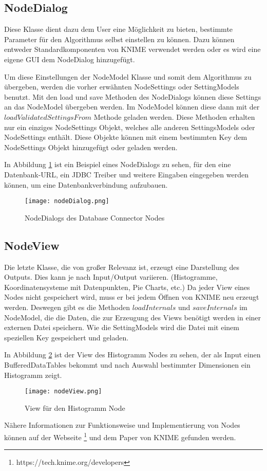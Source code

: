 \subsection{NodeDialog}
\label{ch:Analyse:sec:knime:subsec:nodeDialog}
Diese Klasse dient dazu dem User eine Möglichkeit zu bieten, bestimmte Parameter für den Algorithmus selbst einstellen zu können. 
Dazu können entweder Standardkomponenten von KNIME verwendet werden oder es wird eine eigene GUI dem NodeDialog hinzugefügt.

Um diese Einstellungen der NodeModel Klasse und somit dem Algorithmus zu übergeben, werden die vorher erwähnten NodeSettings oder SettingModels benutzt. Mit den load und save Methoden des NodeDialogs können diese Settings an das NodeModel übergeben werden. Im NodeModel können diese dann mit der $loadValidatedSettingsFrom$ Methode geladen werden. Diese Methoden erhalten nur ein einziges NodeSettings Objekt, welches alle anderen SettingsModels oder NodeSettings enthält. Diese Objekte können mit einem bestimmten Key dem NodeSettings Objekt hinzugefügt oder geladen werden.

In Abbildung \ref{img:nodeDialog} ist ein Beispiel eines NodeDialogs zu sehen, für den eine Datenbank-URL, ein JDBC Treiber und weitere Eingaben eingegeben werden können, um eine Datenbankverbindung aufzubauen.

\begin{figure}[H]
	\centering
	\texttt{[image: nodeDialog.png]}
	\caption{NodeDialogs des Database Connector Nodes}
	\label{img:nodeDialog}
\end{figure}

\subsection{NodeView}
\label{ch:Analyse:sec:knime:subsec:nodeView}
Die letzte Klasse, die von großer Relevanz ist, erzeugt eine Darstellung des Outputs. Dies kann je nach Input/Output variieren. (Histogramme, Koordinatensysteme mit Datenpunkten, Pie Charts, etc.)
Da jeder View eines Nodes nicht gespeichert wird, muss er bei jedem Öffnen von KNIME neu erzeugt werden.
Deswegen gibt es die Methoden $loadInternals$ und $saveInternals$ im NodeModel, die die Daten, die zur Erzeugung des Views benötigt werden in einer externen Datei speichern. Wie die SettingModels wird die Datei mit einem speziellen Key gespeichert und geladen. 

In Abbildung \ref{img:nodeView} ist der View des Histogramm Nodes zu sehen, der als Input einen BufferedDataTables bekommt und nach Auswahl bestimmter Dimensionen ein Histogramm zeigt. 

\begin{figure}[H]
	\centering
	\texttt{[image: nodeView.png]}
	\caption{View für den Histogramm Node}
	\label{img:nodeView}
\end{figure}

Nähere Informationen zur Funktionsweise und Implementierung von Nodes können auf der Webseite \footnote{https://tech.knime.org/developers} und dem Paper \cite{BCDG+07} von KNIME gefunden werden.
